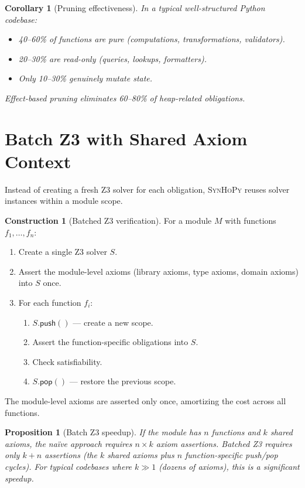 \documentclass[11pt,a4paper]{report}
\theoremstyle{definition}
\newtheorem{construction}[definition]{Construction}
\theoremstyle{plain}
\newtheorem{proposition}[definition]{Proposition}
\newtheorem{corollary}[definition]{Corollary}
\newcommand{\synhopy}{\textsc{SynHoPy}}
\begin{document}
\begin{corollary}[Pruning effectiveness]
In a typical well-structured Python codebase:
\begin{itemize}
  \item 40--60\% of functions are pure (computations, transformations, validators).
  \item 20--30\% are read-only (queries, lookups, formatters).
  \item Only 10--30\% genuinely mutate state.
\end{itemize}
Effect-based pruning eliminates 60--80\% of heap-related obligations.
\end{corollary}


\section{Batch Z3 with Shared Axiom Context}
\label{sec:batch-z3}

Instead of creating a fresh Z3 solver for each obligation, \synhopy{} reuses
solver instances within a module scope.

\begin{construction}[Batched Z3 verification]
For a module $M$ with functions $f_1, \ldots, f_n$:
\begin{enumerate}
  \item Create a single Z3 solver $S$.
  \item Assert the module-level axioms (library axioms, type axioms, domain axioms)
    into $S$ once.
  \item For each function $f_i$:
    \begin{enumerate}
      \item $S.\mathsf{push}()$ --- create a new scope.
      \item Assert the function-specific obligations into $S$.
      \item Check satisfiability.
      \item $S.\mathsf{pop}()$ --- restore the previous scope.
    \end{enumerate}
\end{enumerate}
The module-level axioms are asserted only once, amortizing the cost across
all functions.
\end{construction}

\begin{proposition}[Batch Z3 speedup]
If the module has $n$ functions and $k$ shared axioms, the na\"ive approach
requires $n \times k$ axiom assertions.  Batched Z3 requires only $k + n$
assertions (the $k$ shared axioms plus $n$ function-specific push/pop cycles).
For typical codebases where $k \gg 1$ (dozens of axioms), this is a significant
speedup.
\end{proposition}
\end{document}
